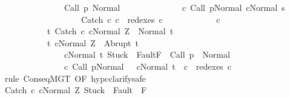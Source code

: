 \begin{isabellebody}
\ \ \ \ \ \ \ \ \ \ \ \ \ \ \ {\isasymGamma}{\isasymturnstile}Call\ p{\isasymdown}\ Normal\ {\isasymsigma}\ {\isasymand}\isanewline
\ \ \ \ \ \ \ \ \ \ \ \ {\isacharparenleft}{\isasymexists}c{\isacharprime}{\isachardot}\ {\isasymGamma}{\isasymturnstile}{\isacharparenleft}Call\ p{\isacharcomma}Normal\ {\isasymsigma}{\isacharparenright}{\isasymrightarrow}\isactrlsup {\isacharplus}{\isacharparenleft}c{\isacharprime}{\isacharcomma}Normal\ s{\isacharparenright}\ {\isasymand}\isanewline
\ \ \ \ \ \ \ \ \ \ \ \ \ \ \ \ \ \ \ Catch\ c\ c\ {\isasymin}\ redexes\ c{\isacharprime}{\isacharparenright}{\isacharbraceright}\isanewline
\ \ \ \ \ \ \ \ \ \ \ \ c\isanewline
\ \ \ \ \ \ \ \ \ \ \ {\isacharbraceleft}t{\isachardot}\ {\isasymGamma}{\isasymturnstile}{\isasymlangle}Catch\ c\ cNormal\ Z{\isasymrangle}\ {\isasymRightarrow}\ Normal\ t{\isacharbraceright}{\isacharcomma}\isanewline
\ \ \ \ \ \ \ \ \ \ \ {\isacharbraceleft}t{\isachardot}\ {\isasymGamma}{\isasymturnstile}{\isasymlangle}cNormal\ Z{\isasymrangle}\ {\isasymRightarrow}\ Abrupt\ t\ {\isasymand}\ \isanewline
\ \ \ \ \ \ \ \ \ \ \ \ \ \ \ {\isasymGamma}{\isasymturnstile}{\isasymlangle}cNormal\ t{\isasymrangle}\ {\isasymRightarrow}{\isasymnotin}{\isacharparenleft}{\isacharbraceleft}Stuck{\isacharbraceright}\ {\isasymunion}\ Fault{\isacharbackquote}{\isacharparenleft}{\isacharminus}F{\isacharparenright}{\isacharparenright}\ {\isasymand}\ {\isasymGamma}{\isasymturnstile}Call\ p\ {\isasymdown}\ Normal\ {\isasymsigma}\ {\isasymand}\isanewline
\ \ \ \ \ \ \ \ \ \ \ \ \ \ \ {\isacharparenleft}{\isasymexists}c{\isacharprime}{\isachardot}\ {\isasymGamma}{\isasymturnstile}{\isacharparenleft}Call\ p{\isacharcomma}Normal\ {\isasymsigma}{\isacharparenright}\ {\isasymrightarrow}\isactrlsup {\isacharplus}\ {\isacharparenleft}c{\isacharprime}{\isacharcomma}Normal\ t{\isacharparenright}\ {\isasymand}\ c\ {\isasymin}\ redexes\ c{\isacharprime}{\isacharparenright}{\isacharbraceright}{\isachardoublequoteclose}\isanewline
\ \ \isamarkupfalse%
\ {\isacharparenleft}rule\ ConseqMGT\ {\isacharbrackleft}OF\ hyp{\isacharunderscore}c{}{\isacharbrackright}{\isacharcomma}clarify{\isacharcomma}safe{\isacharparenright}\ \isanewline
\ \ \ \ \isamarkupfalse%
\ {\isachardoublequoteopen}{\isasymGamma}{\isasymturnstile}{\isasymlangle}Catch\ c\ cNormal\ Z{\isasymrangle}\ {\isasymRightarrow}{\isasymnotin}{\isacharparenleft}{\isacharbraceleft}Stuck{\isacharbraceright}\ {\isasymunion}\ Fault\ {\isacharbackquote}\ {\isacharparenleft}{\isacharminus}F{\isacharparenright}{\isacharparenright}{\isachardoublequoteclose}\isanewline

\end{isabellebody}
